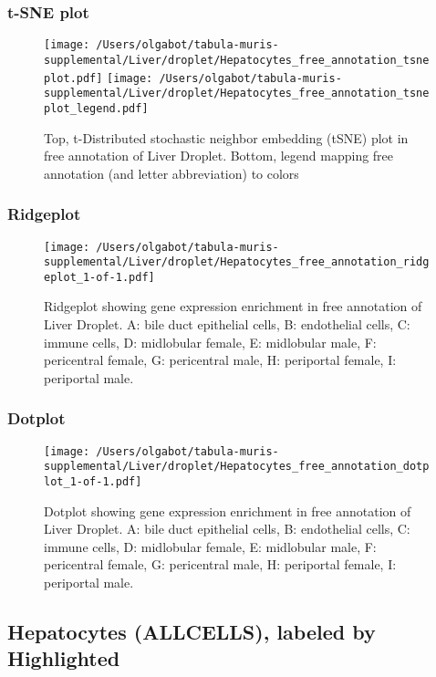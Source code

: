 \clearpage
\subsubsection{t-SNE plot}
\begin{figure}[h]
\centering
\texttt{[image: /Users/olgabot/tabula-muris-supplemental/Liver/droplet/Hepatocytes\_free\_annotation\_tsneplot.pdf]}
\texttt{[image: /Users/olgabot/tabula-muris-supplemental/Liver/droplet/Hepatocytes\_free\_annotation\_tsneplot\_legend.pdf]}
\caption{Top, t-Distributed stochastic neighbor embedding (tSNE) plot  in free annotation of Liver Droplet. Bottom, legend mapping free annotation (and letter abbreviation) to colors}
\end{figure}


\clearpage
\clearpage
\subsubsection{Ridgeplot}
\begin{figure}[h]
\centering
\texttt{[image: /Users/olgabot/tabula-muris-supplemental/Liver/droplet/Hepatocytes\_free\_annotation\_ridgeplot\_1-of-1.pdf]}

\caption{ Ridgeplot  showing gene expression enrichment in free annotation of Liver Droplet. A: bile duct epithelial cells, B: endothelial cells, C: immune cells, D: midlobular female, E: midlobular male, F: pericentral female, G: pericentral male, H: periportal female, I: periportal male.}
\end{figure}


\clearpage
\clearpage
\subsubsection{Dotplot}
\begin{figure}[h]
\centering
\texttt{[image: /Users/olgabot/tabula-muris-supplemental/Liver/droplet/Hepatocytes\_free\_annotation\_dotplot\_1-of-1.pdf]}

\caption{ Dotplot  showing gene expression enrichment in free annotation of Liver Droplet. A: bile duct epithelial cells, B: endothelial cells, C: immune cells, D: midlobular female, E: midlobular male, F: pericentral female, G: pericentral male, H: periportal female, I: periportal male.}
\end{figure}


\clearpage
\subsection{Hepatocytes (ALLCELLS), labeled by Highlighted}


